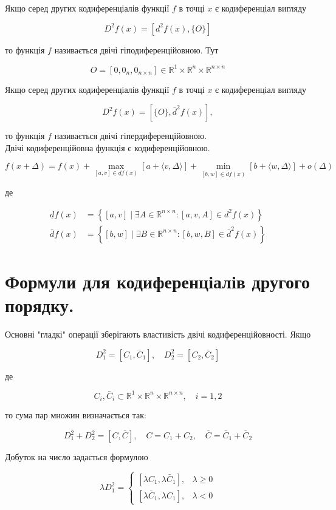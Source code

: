 \documentclass[10pt]{article}
\begin{document}
Якщо серед других кодиференціалів функції $f$ в точці $x$ є кодиференціал вигляду

$$
D^{2} f(x)=\left[d^{2} f(x),\{O\}\right]
$$

то функція $f$ називається двічі гіподиференційовною. Тут

$$
O=\left[0,0_{n}, 0_{n \times n}\right] \in \mathbb{R}^{1} \times \mathbb{R}^{n} \times \mathbb{R}^{n \times n}
$$

Якщо серед других кодиференціалів функції $f$ в точці $x$ є кодиференціал вигляду

$$
D^{2} f(x)=\left[\{O\}, \bar{d}^{2} f(x)\right],
$$

то функція $f$ називається двічі гіпердиференційовною.\\
Двічі кодиференційовна функція є кодиференційовною.

$$
f(x+\Delta)=f(x)+\max _{[a, v] \in \underline{d} f(x)}[a+\langle v, \Delta\rangle]+\min _{[b, w] \in \bar{d} f(x)}[b+\langle w, \Delta\rangle]+o(\Delta)
$$

де

$$
\begin{aligned}
\underline{d} f(x) & =\left\{[a, v] \mid \exists A \in \mathbb{R}^{n \times n}:[a, v, A] \in d^{2} f(x)\right\} \\
\bar{d} f(x) & =\left\{[b, w] \mid \exists B \in \mathbb{R}^{n \times n}:[b, w, B] \in \bar{d}^{2} f(x)\right\}
\end{aligned}
$$

\section*{Формули для кодиференціалів другого порядку.}
Основні "гладкі" операції зберігають властивість двічі кодиференційовності. Якщо

$$
D_{1}^{2}=\left[C_{1}, \bar{C}_{1}\right], \quad D_{2}^{2}=\left[C_{2}, \bar{C}_{2}\right]
$$

де

$$
C_{i}, \bar{C}_{i} \subset \mathbb{R}^{1} \times \mathbb{R}^{n} \times \mathbb{R}^{n \times n}, \quad i=1,2
$$

то сума пар множин визначається так:

$$
D_{1}^{2}+D_{2}^{2}=[C, \bar{C}], \quad C=C_{1}+C_{2}, \quad \bar{C}=\bar{C}_{1}+\bar{C}_{2}
$$

Добуток на число задається формулою

$$
\lambda D_{1}^{2}= \begin{cases}{\left[\lambda C_{1}, \lambda \bar{C}_{1}\right],} & \lambda \geq 0 \\ {\left[\lambda \bar{C}_{1}, \lambda C_{1}\right],} & \lambda<0\end{cases}
$$
\end{document}
